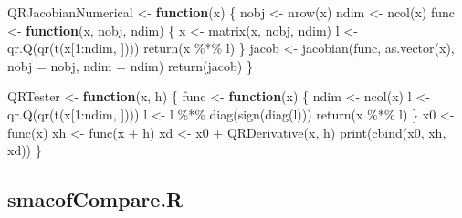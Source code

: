 \documentclass[
  12pt,
  letterpaper,
  DIV=11,
  numbers=noendperiod]{scrartcl}
\newenvironment{Shaded}{\begin{snugshade}}{\end{snugshade}}
\newcommand{\AttributeTok}[1]{\textcolor[rgb]{0.40,0.45,0.13}{#1}}
\newcommand{\ControlFlowTok}[1]{\textcolor[rgb]{0.00,0.23,0.31}{\textbf{#1}}}
\newcommand{\DecValTok}[1]{\textcolor[rgb]{0.68,0.00,0.00}{#1}}
\newcommand{\FunctionTok}[1]{\textcolor[rgb]{0.28,0.35,0.67}{#1}}
\newcommand{\NormalTok}[1]{\textcolor[rgb]{0.00,0.23,0.31}{#1}}
\newcommand{\OtherTok}[1]{\textcolor[rgb]{0.00,0.23,0.31}{#1}}
\newcommand{\SpecialCharTok}[1]{\textcolor[rgb]{0.37,0.37,0.37}{#1}}
\begin{document}
\begin{Shaded}
\begin{Highlighting}[]
\NormalTok{QRJacobianNumerical }\OtherTok{\textless{}{-}} \ControlFlowTok{function}\NormalTok{(x) \{}
\NormalTok{  nobj }\OtherTok{\textless{}{-}} \FunctionTok{nrow}\NormalTok{(x)}
\NormalTok{  ndim }\OtherTok{\textless{}{-}} \FunctionTok{ncol}\NormalTok{(x)}
\NormalTok{  func }\OtherTok{\textless{}{-}} \ControlFlowTok{function}\NormalTok{(x, nobj, ndim) \{}
\NormalTok{    x }\OtherTok{\textless{}{-}} \FunctionTok{matrix}\NormalTok{(x, nobj, ndim)}
\NormalTok{    l }\OtherTok{\textless{}{-}} \FunctionTok{qr.Q}\NormalTok{(}\FunctionTok{qr}\NormalTok{(}\FunctionTok{t}\NormalTok{(x[}\DecValTok{1}\SpecialCharTok{:}\NormalTok{ndim, ])))}
    \FunctionTok{return}\NormalTok{(x }\SpecialCharTok{\%*\%}\NormalTok{ l)}
\NormalTok{  \}}
\NormalTok{  jacob }\OtherTok{\textless{}{-}} \FunctionTok{jacobian}\NormalTok{(func, }\FunctionTok{as.vector}\NormalTok{(x), }\AttributeTok{nobj =}\NormalTok{ nobj, }\AttributeTok{ndim =}\NormalTok{ ndim)}
  \FunctionTok{return}\NormalTok{(jacob)}
\NormalTok{\}}

\NormalTok{QRTester }\OtherTok{\textless{}{-}} \ControlFlowTok{function}\NormalTok{(x, h) \{}
\NormalTok{  func }\OtherTok{\textless{}{-}} \ControlFlowTok{function}\NormalTok{(x) \{}
\NormalTok{    ndim }\OtherTok{\textless{}{-}} \FunctionTok{ncol}\NormalTok{(x)}
\NormalTok{    l }\OtherTok{\textless{}{-}} \FunctionTok{qr.Q}\NormalTok{(}\FunctionTok{qr}\NormalTok{(}\FunctionTok{t}\NormalTok{(x[}\DecValTok{1}\SpecialCharTok{:}\NormalTok{ndim, ])))}
\NormalTok{    l }\OtherTok{\textless{}{-}}\NormalTok{ l }\SpecialCharTok{\%*\%} \FunctionTok{diag}\NormalTok{(}\FunctionTok{sign}\NormalTok{(}\FunctionTok{diag}\NormalTok{(l)))}
    \FunctionTok{return}\NormalTok{(x }\SpecialCharTok{\%*\%}\NormalTok{ l)}
\NormalTok{  \}}
\NormalTok{  x0 }\OtherTok{\textless{}{-}} \FunctionTok{func}\NormalTok{(x)}
\NormalTok{  xh }\OtherTok{\textless{}{-}} \FunctionTok{func}\NormalTok{(x }\SpecialCharTok{+}\NormalTok{ h)}
\NormalTok{  xd }\OtherTok{\textless{}{-}}\NormalTok{ x0 }\SpecialCharTok{+} \FunctionTok{QRDerivative}\NormalTok{(x, h)}
  \FunctionTok{print}\NormalTok{(}\FunctionTok{cbind}\NormalTok{(x0, xh, xd))}
\NormalTok{\}}
\end{Highlighting}
\end{Shaded}

\subsection{smacofCompare.R}\label{smacofcompare.r}
\end{document}
